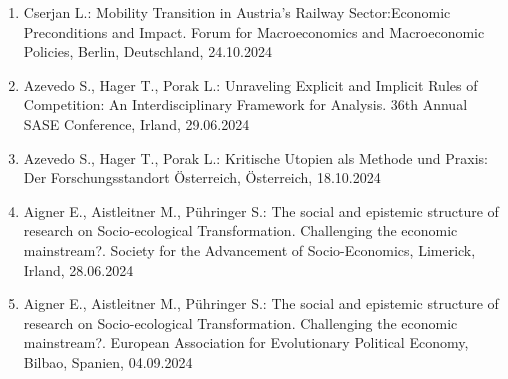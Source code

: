 \begin{enumerate}
	\item Cserjan L.: Mobility Transition in Austria’s Railway Sector:Economic Preconditions and Impact. Forum for Macroeconomics and Macroeconomic Policies, Berlin, Deutschland, 24.10.2024
	\item Azevedo S., Hager T., Porak L.: Unraveling Explicit and Implicit Rules of Competition: An Interdisciplinary Framework for Analysis. 36th Annual SASE Conference, Irland, 29.06.2024
	\item Azevedo S., Hager T., Porak L.: Kritische Utopien als Methode und Praxis: Der Forschungsstandort Österreich, Österreich, 18.10.2024
	\item Aigner E., Aistleitner M., Pühringer S.: The social and epistemic structure of research on Socio-ecological Transformation. Challenging the economic mainstream?. Society for the Advancement of Socio-Economics, Limerick, Irland, 28.06.2024
	\item Aigner E., Aistleitner M., Pühringer S.: The social and epistemic structure of research on Socio-ecological Transformation. Challenging the economic mainstream?. European Association for Evolutionary Political Economy, Bilbao, Spanien, 04.09.2024
\end{enumerate}

